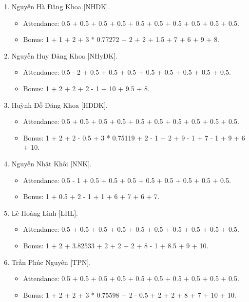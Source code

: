 \documentclass{article}
\begin{document}
\begin{enumerate}
\begin{itemize}
    \end{itemize}
    \item {\sc Nguyễn Hà Đăng Khoa [NHDK].}
    \begin{itemize}
        \item Attendance: 0.5 + 0.5 + 0.5 + 0.5 + 0.5 + 0.5 + 0.5 + 0.5 + 0.5 + 0.5.
        \item Bonus: 1 + 1 + 2 + 3 * 0.77272 + 2 + 2 + 1.5 + 7 + 6 + 9 + 8.
    \end{itemize}
    \item {\sc Nguyễn Huy Đăng Khoa [NHyDK].}
    \begin{itemize}
        \item Attendance: 0.5 - 2 + 0.5 + 0.5 + 0.5 + 0.5 + 0.5 + 0.5 + 0.5 + 0.5.
        \item Bonus: 1 + 2 + 2 + 2 - 1 + 10 + 9.5 + 8.
    \end{itemize}
    \item {\sc Huỳnh Đỗ Đăng Khoa [HDDK].}
    \begin{itemize}
        \item Attendance: 0.5 + 0.5 + 0.5 + 0.5 + 0.5 + 0.5 + 0.5 + 0.5 + 0.5 + 0.5.
        \item Bonus: 1 + 2 + 2 - 0.5 + 3 * 0.75119 + 2 - 1 + 2 + 9 - 1 + 7 - 1 + 9 + 6 + 10.
    \end{itemize}
    \item {\sc Nguyễn Nhật Khôi [NNK].}
    \begin{itemize}
        \item Attendance: 0.5 - 1 + 0.5 + 0.5 + 0.5 + 0.5 + 0.5 + 0.5 + 0.5 + 0.5.
        \item Bonus: 1 + 0.5 + 2 - 1 + 1 + 6 + 7 + 6 + 7.
    \end{itemize}
    \item {\sc Lê Hoàng Linh [LHL].}
    \begin{itemize}
        \item Attendance: 0.5 + 0.5 + 0.5 + 0.5 + 0.5 + 0.5 + 0.5 + 0.5 + 0.5 + 0.5.
        \item Bonus: 1 + 2 + 3.82533 + 2 + 2 + 2 + 8 - 1 + 8.5 + 9 + 10.
    \end{itemize}
    \item {\sc Trần Phúc Nguyên [TPN].}
    \begin{itemize}
        \item Attendance: 0.5 + 0.5 + 0.5 + 0.5 + 0.5 + 0.5 + 0.5 + 0.5 + 0.5 + 0.5.
        \item Bonus: 1 + 2 + 2 + 3 * 0.75598 + 2 - 0.5 + 2 + 2 + 8 + 7 + 10 + 10.

\end{itemize}
\end{enumerate}
\end{document}
